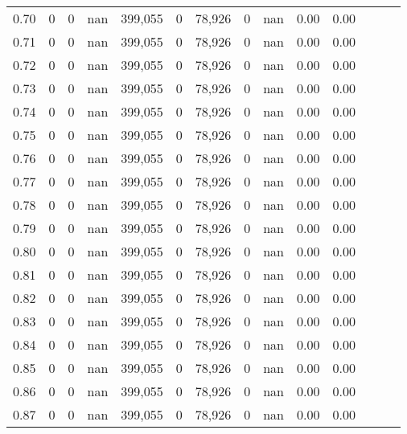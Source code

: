 \begin{tabular}{rrrrrrrrrrrrrr}
0.70 &        0 &       0 &   nan &  399,055 &        0 &  78,926 &       0 &   nan &  0.00 &      0.00 \\
0.71 &        0 &       0 &   nan &  399,055 &        0 &  78,926 &       0 &   nan &  0.00 &      0.00 \\
0.72 &        0 &       0 &   nan &  399,055 &        0 &  78,926 &       0 &   nan &  0.00 &      0.00 \\
0.73 &        0 &       0 &   nan &  399,055 &        0 &  78,926 &       0 &   nan &  0.00 &      0.00 \\
0.74 &        0 &       0 &   nan &  399,055 &        0 &  78,926 &       0 &   nan &  0.00 &      0.00 \\
0.75 &        0 &       0 &   nan &  399,055 &        0 &  78,926 &       0 &   nan &  0.00 &      0.00 \\
0.76 &        0 &       0 &   nan &  399,055 &        0 &  78,926 &       0 &   nan &  0.00 &      0.00 \\
0.77 &        0 &       0 &   nan &  399,055 &        0 &  78,926 &       0 &   nan &  0.00 &      0.00 \\
0.78 &        0 &       0 &   nan &  399,055 &        0 &  78,926 &       0 &   nan &  0.00 &      0.00 \\
0.79 &        0 &       0 &   nan &  399,055 &        0 &  78,926 &       0 &   nan &  0.00 &      0.00 \\
0.80 &        0 &       0 &   nan &  399,055 &        0 &  78,926 &       0 &   nan &  0.00 &      0.00 \\
0.81 &        0 &       0 &   nan &  399,055 &        0 &  78,926 &       0 &   nan &  0.00 &      0.00 \\
0.82 &        0 &       0 &   nan &  399,055 &        0 &  78,926 &       0 &   nan &  0.00 &      0.00 \\
0.83 &        0 &       0 &   nan &  399,055 &        0 &  78,926 &       0 &   nan &  0.00 &      0.00 \\
0.84 &        0 &       0 &   nan &  399,055 &        0 &  78,926 &       0 &   nan &  0.00 &      0.00 \\
0.85 &        0 &       0 &   nan &  399,055 &        0 &  78,926 &       0 &   nan &  0.00 &      0.00 \\
0.86 &        0 &       0 &   nan &  399,055 &        0 &  78,926 &       0 &   nan &  0.00 &      0.00 \\
0.87 &        0 &       0 &   nan &  399,055 &        0 &  78,926 &       0 &   nan &  0.00 &      0.00 \\

\end{tabular}
